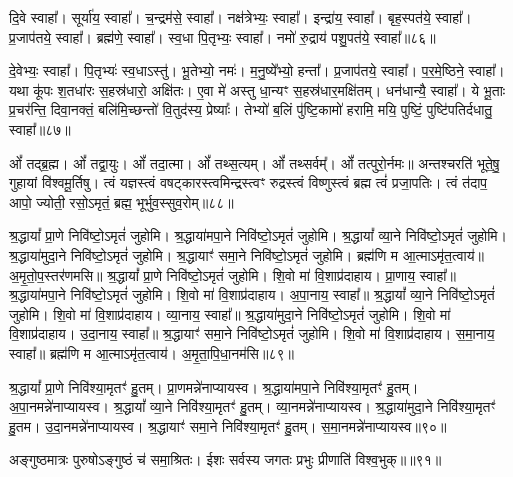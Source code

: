 दि॒वे स्वाहा᳚। 
सूर्या॑य॒ स्वाहा᳚। 
च॒न्द्रम॑से॒ स्वाहा᳚। 
नक्ष॑त्रेभ्यः॒ स्वाहा᳚। 
इन्द्रा॑य॒ स्वाहा᳚। 
बृह॒स्पत॑ये॒ स्वाहा᳚। 
प्र॒जाप॑तये॒ स्वाहा᳚। 
ब्रह्म॑णे॒ स्वाहा᳚। 
स्व॒धा पि॒तृभ्यः॒ स्वाहा᳚। 
नमो॑ रु॒द्राय॑ पशु॒पत॑ये॒ स्वाहा᳚॥८६॥

दे॒वेभ्यः॒ स्वाहा᳚। 
पि॒तृभ्यः॑ स्व॒धाऽस्तु॑। 
भू॒तेभ्यो॒ नमः॑। 
म॒नु॒ष्ये᳚भ्यो॒ हन्ता᳚। 
प्र॒जाप॑तये॒ स्वाहा᳚। 
प॒र॒मे॒ष्ठिने॒ स्वाहा᳚। 
यथा कू॑पः श॒तधा॑रः स॒हस्र॑धारो॒ अक्षि॑तः। 
ए॒वा मे॑ अस्तु धा॒न्यꣳ स॒हस्र॑धार॒मक्षि॑तम्। 
धन॑धान्यै॒ स्वाहा᳚। 
ये भू॒ताः प्र॒चर॑न्ति॒ दिवा॒नक्तं॒ बलि॑मि॒च्छन्तो॑ वि॒तुद॑स्य॒ प्रेष्याः᳚। 
तेभ्यो॑ ब॒लिं पु॑ष्टि॒कामो॑ हरामि॒ मयि॒ पुष्टिं॒ पुष्टि॑पतिर्दधातु॒ स्वाहा᳚॥८७॥ 
\anuvakamend

ओं᳚ तद्ब्र॒ह्म। 
ओं᳚ तद्वा॒युः। 
ओं᳚ तदा॒त्मा। 
ओं᳚ तथ्स॒त्यम्‌।
ओं᳚ तथ्सर्वम्᳚‌। 
ओं᳚ तत्पुरो॒र्नमः॥
अन्तश्चरति॑ भूते॒षु॒ गुहायां वि॑श्वमू॒र्तिषु। 
त्वं यज्ञस्त्वं वषट्कारस्त्वमिन्द्रस्त्वꣳ रुद्रस्त्वं विष्णुस्त्वं ब्रह्म त्वं॑ प्रजा॒पतिः।
त्वं त॑दाप॒ आपो॒ ज्योती॒ रसो॒ऽमृतं॒ ब्रह्म॒ भूर्भुव॒स्सुव॒रोम्‌॥८८॥
\anuvakamend

श्र॒द्धायां᳚ प्रा॒णे निवि॑ष्टो॒ऽमृतं॑ जुहोमि। 
श्र॒द्धाया॑मपा॒ने निवि॑ष्टो॒ऽमृतं॑ जुहोमि। 
श्र॒द्धायां᳚ व्या॒ने निवि॑ष्टो॒ऽमृतं॑ जुहोमि। 
श्र॒द्धाया॑मुदा॒ने निवि॑ष्टो॒ऽमृतं॑ जुहोमि। 
श्र॒द्धायाꣳ॑ समा॒ने निवि॑ष्टो॒ऽमृतं॑ जुहोमि। 
ब्रह्म॑णि म आ॒त्माऽमृ॑त॒त्वाय॑॥ 
अ॒मृ॒तो॒प॒स्तर॑णमसि॥ 
श्र॒द्धायां᳚ प्रा॒णे निवि॑ष्टो॒ऽमृतं॑ जुहोमि। 
शि॒वो मा॑ वि॒शाप्र॑दाहाय। 
प्रा॒णाय॒ स्वाहा᳚॥ 
श्र॒द्धाया॑मपा॒ने निवि॑ष्टो॒ऽमृतं॑ जुहोमि। 
शि॒वो मा॑ वि॒शाप्र॑दाहाय। 
अ॒पा॒नाय॒ स्वाहा᳚॥ 
श्र॒द्धायां᳚ व्या॒ने निवि॑ष्टो॒ऽमृतं॑ जुहोमि। 
शि॒वो मा॑ वि॒शाप्र॑दाहाय। 
व्या॒नाय॒ स्वाहा᳚॥ 
श्र॒द्धाया॑मुदा॒ने निवि॑ष्टो॒ऽमृतं॑ जुहोमि। 
शि॒वो मा॑ वि॒शाप्र॑दाहाय। 
उ॒दा॒नाय॒ स्वाहा᳚॥ 
श्र॒द्धायाꣳ॑ समा॒ने निवि॑ष्टो॒ऽमृतं॑ जुहोमि। 
शि॒वो मा॑ वि॒शाप्र॑दाहाय। 
स॒मा॒नाय॒ स्वाहा᳚॥ 
ब्रह्म॑णि म आ॒त्माऽमृ॑त॒त्वाय॑। 
अ॒मृ॒ता॒पि॒धा॒नम॑सि॥८९॥
 \anuvakamend


श्र॒द्धायां᳚ प्रा॒णे निवि॑श्या॒मृतꣳ॑ हु॒तम्। 
प्रा॒णमन्ने॑नाप्यायस्व। 
श्र॒द्धाया॑मपा॒ने निवि॑श्या॒मृतꣳ॑ हु॒तम्। 
अ॒पा॒नमन्ने॑नाप्यायस्व।
श्र॒द्धायां᳚ व्या॒ने निवि॑श्या॒मृतꣳ॑ हु॒तम्। 
व्या॒नमन्ने॑नाप्यायस्व। 
श्र॒द्धाया॑मुदा॒ने निवि॑श्या॒मृतꣳ॑ हु॒तम। 
उ॒दा॒नमन्ने॑नाप्यायस्व।
श्र॒द्धायाꣳ॑ समा॒ने निवि॑श्या॒मृतꣳ॑ हु॒तम्। 
स॒मा॒नमन्ने॑नाप्या\-यस्व॥९०॥\anuvakamend

अङ्गुष्ठमात्रः पुरुषोऽङ्गुष्ठं च॑ समा॒श्रितः। 
ईशः सर्वस्य जगतः प्रभुः प्रीणाति॑ विश्व॒भुक्॥॥९१॥\anuvakamend

